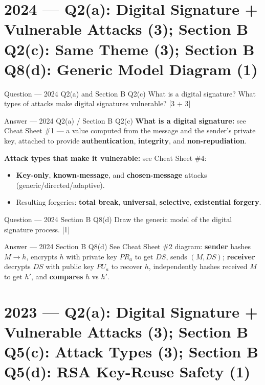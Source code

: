 \documentclass[12pt,a4paper]{article}
\begin{document}
\newpage
\section{2024 --- Q2(a): Digital Signature + Vulnerable Attacks (3); Section B Q2(c): Same Theme (3); Section B Q8(d): Generic Model Diagram (1)}

\begin{qbox}{Question --- 2024 Q2(a) and Section B Q2(c)}
What is a digital signature? What types of attacks make digital signatures vulnerable? \hfill [3 + 3]
\end{qbox}

\begin{solbox}{Answer --- 2024 Q2(a) / Section B Q2(c)}
\textbf{What is a digital signature:} see Cheat Sheet \#1 --- a value computed from the message and the sender's private key, attached to provide \textbf{authentication}, \textbf{integrity}, and \textbf{non-repudiation}.

\textbf{Attack types that make it vulnerable:} see Cheat Sheet \#4:
\begin{itemize}[noitemsep]
  \item \textbf{Key-only}, \textbf{known-message}, and \textbf{chosen-message} attacks (generic/directed/adaptive).
  \item Resulting forgeries: \textbf{total break}, \textbf{universal}, \textbf{selective}, \textbf{existential forgery}.
\end{itemize}
\end{solbox}

\begin{qbox}{Question --- 2024 Section B Q8(d)}
Draw the generic model of the digital signature process. \hfill [1]
\end{qbox}

\begin{solbox}{Answer --- 2024 Section B Q8(d)}
See Cheat Sheet \#2 diagram: \textbf{sender} hashes $M \to h$, encrypts $h$ with private key $PR_a$ to get $DS$, sends $(M,DS)$; \textbf{receiver} decrypts $DS$ with public key $PU_a$ to recover $h$, independently hashes received $M$ to get $h'$, and \textbf{compares} $h$ vs $h'$.
\end{solbox}

\newpage
\section{2023 --- Q2(a): Digital Signature + Vulnerable Attacks (3); Section B Q5(c): Attack Types (3); Section B Q5(d): RSA Key-Reuse Safety (1)}
\end{document}
